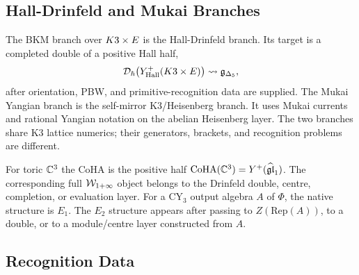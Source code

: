 \subsection*{Hall-Drinfeld and Mukai Branches}

The BKM branch over $K3\times E$ is the Hall-Drinfeld branch.  Its
target is a completed double of a positive Hall half,
\[
  \mathcal D_\hbar\bigl(Y^{+}_{\mathrm{Hall}}(K3\times E)\bigr)
  \leadsto \mathfrak{g}_{\Delta_5} ,
\]
after orientation, PBW, and primitive-recognition data are supplied.
The Mukai Yangian branch is the self-mirror K3/Heisenberg branch.  It
uses Mukai currents and rational Yangian notation on the abelian
Heisenberg layer.  The two branches share K3 lattice numerics; their
generators, brackets, and recognition problems are different.

For toric $\mathbb{C}^3$ the CoHA is the positive half
$\mathrm{CoHA}(\mathbb{C}^3)=Y^{+}(\widehat{\mathfrak{gl}}_1)$.  The corresponding
full $\mathcal{W}_{1+\infty}$ object belongs to the Drinfeld double, centre,
completion, or evaluation layer.  For a CY$_3$ output algebra $A$ of
$\Phi$, the native structure is $E_1$.  The $E_2$ structure appears
after passing to $Z(\mathrm{Rep}(A))$, to a double, or to a
module/centre layer constructed from $A$.

\subsection*{Recognition Data}


